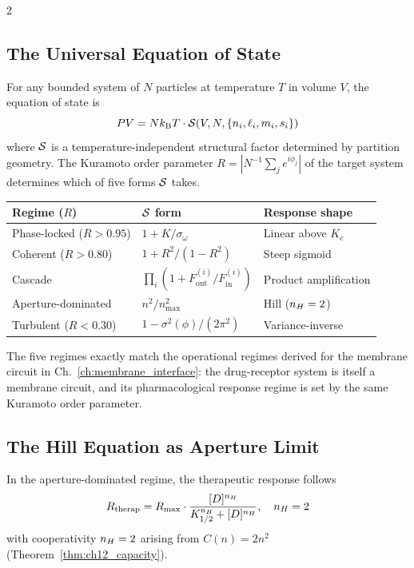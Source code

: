 \begin{multicols}{2}

\subsection{The Universal Equation of State}

For any bounded system of $N$ particles at temperature $T$ in volume $V$, the equation of state is
\begin{equation}
PV = Nk_{\mathrm{B}} T\cdot\mathcal{S}\!\left(V, N, \{n_i, \ell_i, m_i, s_i\}\right)
\label{eq:ch12_eos}
\end{equation}
where $\mathcal{S}$ is a temperature-independent structural factor determined by partition geometry. The Kuramoto order parameter $R = |N^{-1}\sum_j e^{i\phi_j}|$ of the target system determines which of five forms $\mathcal{S}$ takes.

\begin{center}
\begin{tabular}{lll}
\toprule
Regime ($R$) & $\mathcal{S}$ form & Response shape \\
\midrule
Phase-locked ($R > 0.95$) & $1 + K/\sigma_\omega$ & Linear above $K_c$ \\
Coherent ($R > 0.80$)     & $1 + R^2/(1-R^2)$    & Steep sigmoid \\
Cascade                   & $\prod_i(1+F_{\mathrm{out}}^{(i)}/F_{\mathrm{in}}^{(i)})$ & Product amplification \\
Aperture-dominated        & $n^2/n_{\max}^2$     & Hill ($n_H = 2$) \\
Turbulent ($R < 0.30$)    & $1 - \sigma^2(\phi)/(2\pi^2)$ & Variance-inverse \\
\bottomrule
\end{tabular}
\end{center}

The five regimes exactly match the operational regimes derived for the membrane circuit in Ch.~\ref{ch:membrane_interface}: the drug-receptor system is itself a membrane circuit, and its pharmacological response regime is set by the same Kuramoto order parameter.

\subsection{The Hill Equation as Aperture Limit}

\begin{theorem}
\label{thm:ch12_hill}
In the aperture-dominated regime, the therapeutic response follows
\begin{equation}
R_{\mathrm{therap}} = R_{\max}\cdot\frac{[D]^{n_H}}{K_{1/2}^{n_H} + [D]^{n_H}}, \quad n_H = 2
\label{eq:ch12_hill}
\end{equation}
with cooperativity $n_H = 2$ arising from $C(n) = 2n^2$ (Theorem~\ref{thm:ch12_capacity}).
\end{theorem}


\end{multicols}
